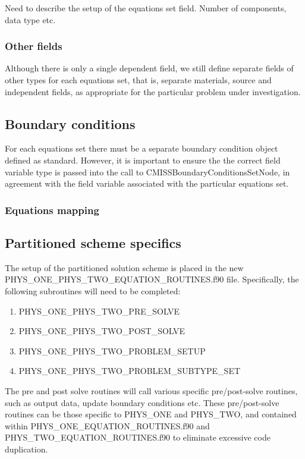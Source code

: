 Need to describe the setup of the equations set field. Number of components, data type etc.
 




\subsubsection{Other fields}

Although there is only a single dependent field, we still define separate fields of other types for each equations set, that is, separate materials, source and independent fields, as appropriate for the particular problem under investigation.

\subsection{Boundary conditions}

For each equations set there must be a separate boundary condition object defined as standard. However, it is important to ensure the the correct field variable type is passed into the call to CMISSBoundaryConditionsSetNode, in agreement with the field variable associated with the particular equations set.


\subsubsection{Equations mapping}

\subsection{Partitioned scheme specifics}
\label{partitionspec}
The setup of the partitioned solution scheme is placed in the new PHYS\_ONE\_PHYS\_TWO\_EQUATION\_ROUTINES.f90 file. Specifically, the following subroutines will need to be completed:
\begin{enumerate}
 \item PHYS\_ONE\_PHYS\_TWO\_PRE\_SOLVE
 \item PHYS\_ONE\_PHYS\_TWO\_POST\_SOLVE
 \item PHYS\_ONE\_PHYS\_TWO\_PROBLEM\_SETUP
 \item PHYS\_ONE\_PHYS\_TWO\_PROBLEM\_SUBTYPE\_SET
\end{enumerate}

The pre and post solve routines will call various specific pre/post-solve routines, such as output data, update boundary conditions etc. These pre/post-solve routines can be those specific to PHYS\_ONE and PHYS\_TWO, and contained within PHYS\_ONE\_EQUATION\_ROUTINES.f90 and PHYS\_TWO\_EQUATION\_ROUTINES.f90 to eliminate excessive code duplication.

